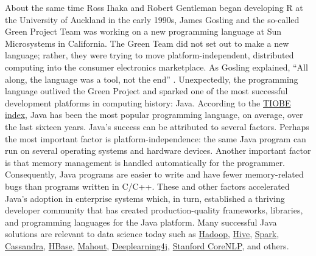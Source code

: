 About the same time Ross Ihaka and Robert Gentleman began developing R at the University of Auckland in the early 1990s, James Gosling and the so-called Green Project Team was working on a new programming language at Sun Microsystems in California. The Green Team did not set out to make a new language; rather, they were trying to move platform-independent, distributed computing into the consumer electronics marketplace. As Gosling explained, ``All along, the language was a tool, not the end'' \citep{javainsidestory}. Unexpectedly, the programming language outlived the Green Project and sparked one of the most successful development platforms in computing history: Java. According to the \href{https://www.tiobe.com/tiobe-index/}{TIOBE index}, Java has been the most popular programming language, on average, over the last sixteen years. Java's success can be attributed to several factors. Perhaps the most important factor is platform-independence: the same Java program can run on several operating systems and hardware devices. Another important factor is that memory management is handled automatically for the programmer. Consequently, Java programs are easier to write and have fewer memory-related bugs than programs written in C/C++. These and other factors accelerated Java's adoption in enterprise systems which, in turn, established a thriving developer community that has created production-quality frameworks, libraries, and programming languages for the Java platform. Many successful Java solutions are relevant to data science today such as \href{http://hadoop.apache.org/}{Hadoop}, \href{https://hive.apache.org/}{Hive}, \href{https://spark.apache.org/}{Spark}, \href{http://cassandra.apache.org/}{Cassandra}, \href{https://hbase.apache.org/}{HBase}, \href{https://mahout.apache.org/}{Mahout}, \href{https://deeplearning4j.org/}{Deeplearning4j}, \href{https://stanfordnlp.github.io/CoreNLP/}{Stanford CoreNLP}, and others.

